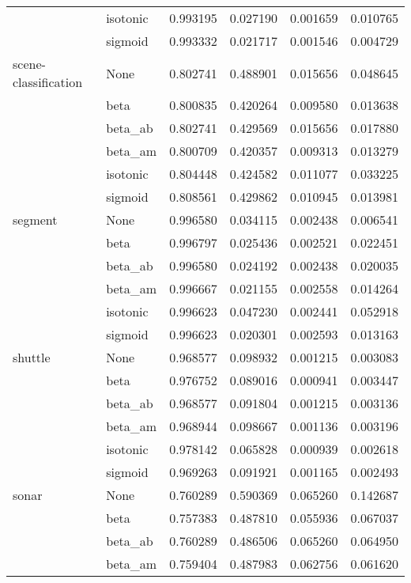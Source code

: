 \begin{tabular}{llrrrr}
        & isotonic &  0.993195 &  0.027190 &  0.001659 &  0.010765 \\
        & sigmoid &  0.993332 &  0.021717 &  0.001546 &  0.004729 \\
scene-classification & None &  0.802741 &  0.488901 &  0.015656 &  0.048645 \\
        & beta &  0.800835 &  0.420264 &  0.009580 &  0.013638 \\
        & beta\_ab &  0.802741 &  0.429569 &  0.015656 &  0.017880 \\
        & beta\_am &  0.800709 &  0.420357 &  0.009313 &  0.013279 \\
        & isotonic &  0.804448 &  0.424582 &  0.011077 &  0.033225 \\
        & sigmoid &  0.808561 &  0.429862 &  0.010945 &  0.013981 \\
segment & None &  0.996580 &  0.034115 &  0.002438 &  0.006541 \\
        & beta &  0.996797 &  0.025436 &  0.002521 &  0.022451 \\
        & beta\_ab &  0.996580 &  0.024192 &  0.002438 &  0.020035 \\
        & beta\_am &  0.996667 &  0.021155 &  0.002558 &  0.014264 \\
        & isotonic &  0.996623 &  0.047230 &  0.002441 &  0.052918 \\
        & sigmoid &  0.996623 &  0.020301 &  0.002593 &  0.013163 \\
shuttle & None &  0.968577 &  0.098932 &  0.001215 &  0.003083 \\
        & beta &  0.976752 &  0.089016 &  0.000941 &  0.003447 \\
        & beta\_ab &  0.968577 &  0.091804 &  0.001215 &  0.003136 \\
        & beta\_am &  0.968944 &  0.098667 &  0.001136 &  0.003196 \\
        & isotonic &  0.978142 &  0.065828 &  0.000939 &  0.002618 \\
        & sigmoid &  0.969263 &  0.091921 &  0.001165 &  0.002493 \\
sonar & None &  0.760289 &  0.590369 &  0.065260 &  0.142687 \\
        & beta &  0.757383 &  0.487810 &  0.055936 &  0.067037 \\
        & beta\_ab &  0.760289 &  0.486506 &  0.065260 &  0.064950 \\
        & beta\_am &  0.759404 &  0.487983 &  0.062756 &  0.061620 \\

\end{tabular}
